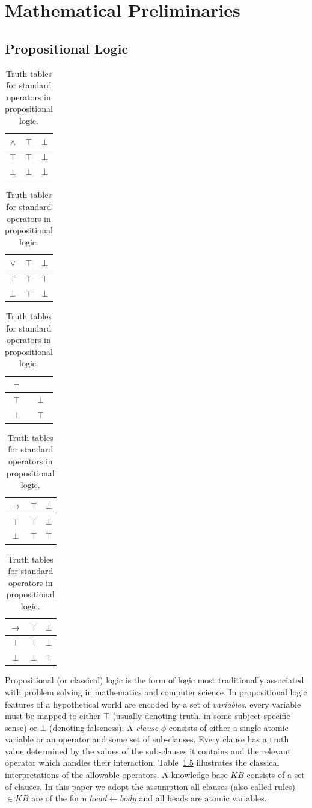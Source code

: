 \documentclass[
11pt, %
english, %
singlespacing, %
headsepline, %
]{MastersDoctoralThesis} %
\begin{document}
\chapter{Mathematical Preliminaries}
\section{Propositional Logic}

\begin{table}
\begin{center}


\begin{tabular}{ c | c c }
  $\land$& $\top$ & $\bot$ \\ \hline
 $\top$ & $\top$ & $\bot$ \\  
 $\bot$ & $\bot$ &  $\bot$
\end{tabular}
\quad
\begin{tabular}{ c | c c }
  $\lor$& $\top$ & $\bot$ \\ \hline
 $\top$ & $\top$ & $\top$ \\  
 $\bot$ & $\top$ &  $\bot$
\end{tabular}
\quad
\begin{tabular}{ c | c }
  $\lnot$& \\ \hline
 $\top$ & $\bot$ \\  
 $\bot$ & $\top$
\end{tabular}

\begin{tabular}{ c | c c }
  $\rightarrow$& $\top$ & $\bot$ \\ \hline
 $\top$ & $\top$ & $\bot$ \\  
 $\bot$ & $\top$ &  $\top$
\end{tabular}
\quad
\begin{tabular}{ c | c c }
  $\rightarrow$& $\top$ & $\bot$ \\ \hline
 $\top$ & $\top$ & $\bot$ \\  
 $\bot$ & $\bot$ &  $\top$
\end{tabular}

\caption{Truth tables for standard operators in propositional logic.}
\label{tbl:prop}

\end{center}
\end{table}

Propositional (or classical) logic is the form of logic most traditionally associated with problem solving in mathematics and computer science. In propositional logic features of a hypothetical world are encoded by a set of \textit{variables}. every variable must be mapped to either $\top$ (usually denoting truth, in some subject-specific sense) or $\bot$ (denoting falseness). A \textit{clause} $\phi$ consists of either a single atomic variable or an operator and some set of sub-clauses. Every clause has a truth value determined by the values of the sub-clauses it contains and the relevant operator which handles their interaction. Table~\ref{tbl:prop} illustrates the classical interpretations of the allowable operators. A knowledge base $KB$ consists of a set of clauses. In this paper we adopt the assumption all clauses (also called rules) $\in KB$ are of the form $head\leftarrow body$ and all heads are atomic variables.
\end{document}
